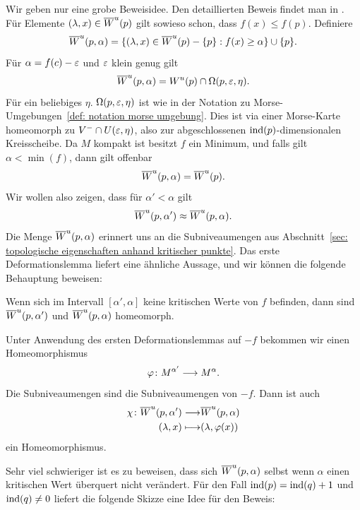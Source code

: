\begin{bigproof}
    Wir geben nur eine grobe Beweisidee. Den detaillierten Beweis findet man in \cite{audin}.
    Für Elemente $(\lambda, x) \in { \overline{W}^u } (p)$ gilt sowieso schon, dass $f(x) \leq f(p)$. Definiere
    \[ { \overline{W}^u } (p, \alpha) = 
        \{ (\lambda, x) \in { \overline{W}^u } (p) - \{ p \} : f(x) \geq \alpha \}  \cup \{ p \} . \]
    Für $\alpha = f(c) - \varepsilon$ und $\varepsilon$ klein genug gilt 
    \[ { \overline{W}^u } (p, \alpha) = { W^u } (p) \cap \Omega (p, \varepsilon, \eta) . \]
    Für ein beliebiges $\eta$. $\Omega (p, \varepsilon, \eta)$ ist wie in der Notation zu 
    Morse-Umgebungen~\ref{def: notation morse umgebung}. Dies ist via einer Morse-Karte homeomorph 
    zu $V^- \cap U(\varepsilon, \eta)$, also zur abgeschlossenen ${ \operatorname{ind} } (p)$-dimensionalen Kreisscheibe.
    Da $M$ kompakt ist besitzt $f$ ein Minimum, und falls gilt $\alpha < \min (f)$, dann gilt 
    offenbar
    \[ { \overline{W}^u } (p, \alpha) = { \overline{W}^u } (p) . \]
    Wir wollen also zeigen, dass für $\alpha' < \alpha$ gilt
    \[ { \overline{W}^u } (p, \alpha') \approx { \overline{W}^u } (p, \alpha) . \]
    Die Menge ${ \overline{W}^u } (p, \alpha)$ erinnert uns an die Subniveaumengen aus 
    Abschnitt~\ref{sec: topologische eigenschaften anhand kritischer punkte}. Das erste 
    Deformationslemma liefert eine ähnliche Aussage, und wir können die folgende Behauptung 
    beweisen:

    \begin{claim}
        Wenn sich im Intervall $[\alpha', \alpha]$ keine kritischen Werte von $f$
        befinden, dann sind ${ \overline{W}^u } (p, \alpha')$ und ${ \overline{W}^u } (p, \alpha)$ homeomorph.
    \end{claim}

    \begin{smallproof}
        Unter Anwendung des ersten Deformationslemmas auf $-f$ bekommen wir einen Homeomorphismus
        \[ \varphi \colon M^{\alpha'} \longrightarrow M^{\alpha} . \]
        Die Subniveaumengen sind die Subniveaumengen von $-f$. Dann ist auch 
        \begin{align*}
            \chi \colon { \overline{W}^u } (p, \alpha') \longrightarrow & { \overline{W}^u } (p, \alpha) \\
            (\lambda, x) \longmapsto & (\lambda, \varphi(x))
        \end{align*}
        ein Homeomorphismus.
    \end{smallproof}

    Sehr viel schwieriger ist es zu beweisen, dass sich ${ \overline{W}^u } (p, \alpha)$ selbst wenn $\alpha$
    einen kritischen Wert überquert nicht verändert. Für den Fall ${ \operatorname{ind} } (p) = { \operatorname{ind} } (q) + 1$
    und ${ \operatorname{ind} } (q) \neq 0$ liefert die folgende Skizze eine Idee für den Beweis:


\end{bigproof}
